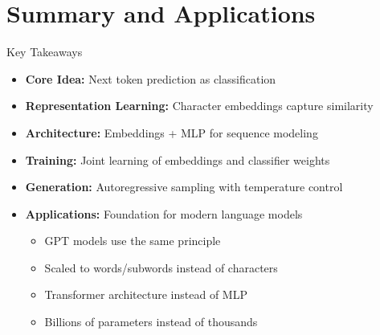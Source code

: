\documentclass[usenames,dvipsnames]{beamer}
\begin{document}
\section{Summary and Applications}

\begin{frame}{Key Takeaways}
\begin{itemize}
\item \textbf{Core Idea:} Next token prediction as classification
\pause
\item \textbf{Representation Learning:} Character embeddings capture similarity
\pause
\item \textbf{Architecture:} Embeddings + MLP for sequence modeling
\pause
\item \textbf{Training:} Joint learning of embeddings and classifier weights
\pause
\item \textbf{Generation:} Autoregressive sampling with temperature control
\pause
\item \textbf{Applications:} Foundation for modern language models
\begin{itemize}
\item GPT models use the same principle
\item Scaled to words/subwords instead of characters
\pause
\item Transformer architecture instead of MLP
\item Billions of parameters instead of thousands
\end{itemize}
\end{itemize}
\end{frame}
\end{document}
